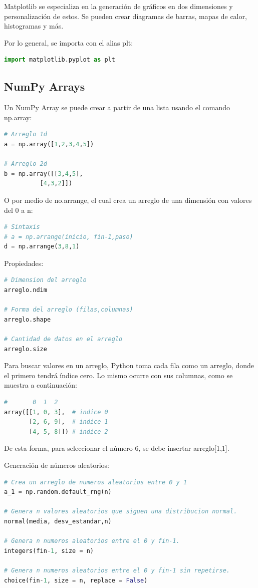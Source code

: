 \documentclass[a4paper, 12pt]{book}
\begin{document}
Matplotlib se especializa en la generación de gráficos en dos dimensiones y personalización de estos. Se pueden crear diagramas de barras, mapas de calor, histogramas y más.

Por lo general, se importa con el alias plt:
\begin{lstlisting}[language=Python]
import matplotlib.pyplot as plt
\end{lstlisting}

\subsection{NumPy Arrays}
Un NumPy Array se puede crear a partir de una lista usando el comando np.array:
\begin{lstlisting}[language=Python]
# Arreglo 1d
a = np.array([1,2,3,4,5])

# Arreglo 2d
b = np.array([[3,4,5],
	      [4,3,2]])
\end{lstlisting}
O por medio de no.arrange, el cual crea un arreglo de una dimensión con valores del 0 a n:
\begin{lstlisting}[language=Python]
# Sintaxis
# a = np.arrange(inicio, fin-1,paso)
d = np.arrange(3,8,1)
\end{lstlisting}

Propiedades:
\begin{lstlisting}[language=Python]
# Dimension del arreglo
arreglo.ndim
	
# Forma del arreglo (filas,columnas)
arreglo.shape
	
# Cantidad de datos en el arreglo
arreglo.size
\end{lstlisting}

Para buscar valores en un arreglo, Python toma cada fila como un arreglo, donde el primero tendrá índice cero. Lo mismo ocurre con sus columnas, como se muestra a continuación:
\begin{lstlisting}[language=Python]
#       0  1  2
array([[1, 0, 3],  # indice 0
       [2, 6, 9],  # indice 1
       [4, 5, 8]]) # indice 2
\end{lstlisting}
De esta forma, para seleccionar el número 6, se debe insertar arreglo[1,1].


Generación de números aleatorios:
\begin{lstlisting}[language=Python]
# Crea un arreglo de numeros aleatorios entre 0 y 1
a_1 = np.random.default_rng(n)
	
# Genera n valores aleatorios que siguen una distribucion normal.
normal(media, desv_estandar,n)
	
# Genera n numeros aleatorios entre el 0 y fin-1.
integers(fin-1, size = n)
	
# Genera n numeros aleatorios entre el 0 y fin-1 sin repetirse.
choice(fin-1, size = n, replace = False)
\end{lstlisting}
\end{document}
